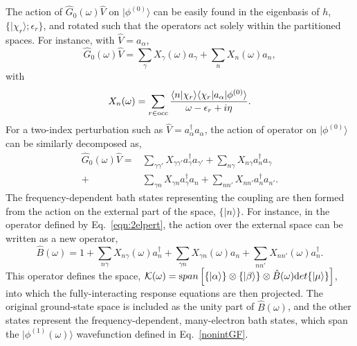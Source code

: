 \documentclass[aps,showpacs,twocolumn,nobibnotes]{revtex4}
\begin{document}
The action of ${\hat G_0}(\omega){\hat V}$ on $|\phi^{(0)} \rangle$ can be easily found in the eigenbasis of $h$, $\{ |\chi_r \rangle ; \epsilon_r \}$, 
and rotated such that the operators act solely within the partitioned spaces. For instance, with ${\hat V}=a_{\alpha}$, 
\begin{equation}
    {\hat G_0}(\omega){\hat V} = \sum_{\gamma} X_{\gamma}(\omega) a_{\gamma} + \sum_{n} X_{n}(\omega) a_n  ,
\end{equation}
with
\begin{equation}
    X_n(\omega) = \sum_{r \in {\textrm occ}} \frac{\langle n|\chi_r \rangle \langle \chi_r | a_{\alpha} | \phi^{(0)} \rangle}{\omega - \epsilon_r + i \eta}   .
\end{equation}
For a two-index perturbation such as ${\hat V}=a_{\alpha}^{\dagger}a_{\alpha}$, the action of operator on $|\phi^{(0)} \rangle$ can be similarly decomposed as,
\begin{align}
    {\hat G_0}(\omega){\hat V} =& \sum_{\gamma \gamma'} X_{\gamma \gamma'} a_{\gamma}^{\dagger} a_{\gamma'} + \sum_{n \gamma} X_{n \gamma} a_n^{\dagger} a_{\gamma} \nonumber\\ 
                               +& \sum_{\gamma n} X_{\gamma n} a_{\gamma}^{\dagger} a_{n}  + \sum_{n n'} X_{n n'} a_n^{\dagger} a_{n'}    .   \label{eqn:2elpert}
\end{align}
The frequency-dependent bath states representing the coupling are then formed from the action on the external part of the space, $\{| n \rangle \}$. For instance, in the 
operator defined by Eq.~\ref{eqn:2elpert}, the action over the external space can be written as a new operator,
\begin{equation}
    {\hat B}(\omega) = 1 + \sum_{n \gamma} X_{n \gamma}(\omega) a_n^{\dagger} + \sum_{\gamma n} X_{\gamma n}(\omega) a_{n} + \sum_{n n'} X_{n n'}(\omega) a_n^{\dagger} .   \label{eqn:B}
\end{equation}
This operator defines the space, \mbox{$\mathcal{K}(\omega)={\textrm span} \left[ \{|\alpha \rangle \} \otimes \{ |\beta \rangle \} \otimes {\hat B}(\omega) {\textrm det} \{ | \mu \rangle \} \right]$}, into which the fully-interacting 
response equations are then projected. The original ground-state space is included as the unity part of ${\hat B}(\omega)$, and the other states represent 
the frequency-dependent, many-electron bath states, which span the $|\phi^{(1)}(\omega) \rangle$ wavefunction defined in Eq.~\ref{nonintGF}.
\end{document}
